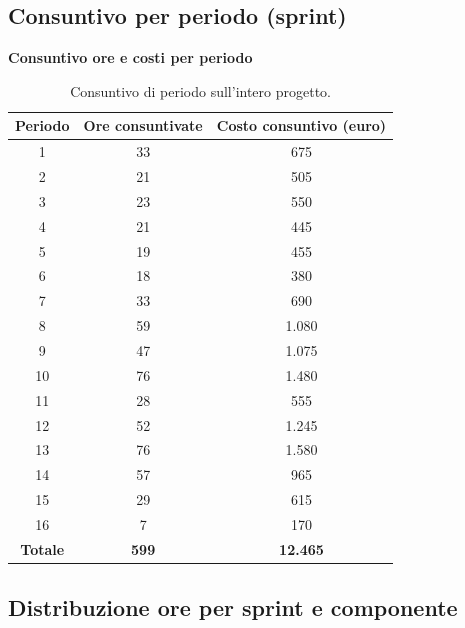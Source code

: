 \documentclass[a4paper, 11pt, oneside]{scrartcl} %
\begin{document}
\subsection{Consuntivo per periodo (sprint)}

\begin{table}[!ht]
\centering
{\large \textbf{Consuntivo ore e costi per periodo}} \\
\vspace{0.3cm}
\renewcommand{\arraystretch}{1.3}
\begin{tabular}{|c|c|c|}
\hline
\textbf{Periodo} & \textbf{Ore consuntivate} & \textbf{Costo consuntivo (euro)} \\
\hline
1 & 33 & 675 \\
2 & 21 & 505 \\
3 & 23 & 550 \\
4 & 21 & 445 \\
5 & 19 & 455 \\
6 & 18 & 380 \\
7 & 33 & 690 \\
8 & 59 & 1.080 \\
9 & 47 & 1.075 \\
10 & 76 & 1.480 \\
11 & 28 & 555 \\
12 & 52 & 1.245 \\
13 & 76 & 1.580 \\
14 & 57 & 965 \\
15 & 29 & 615 \\
16 & 7 & 170 \\
\hline
\rowcolor{blue!10}
\textbf{Totale} & \textbf{599} & \textbf{12.465} \\
\hline
\end{tabular}
\caption{Consuntivo di periodo sull'intero progetto.}
\label{tab:consuntivo_periodi_finale}
\end{table}
\FloatBarrier

\subsection{Distribuzione ore per sprint e componente}
\end{document}
